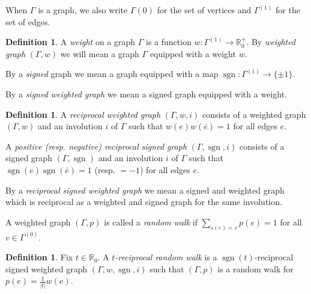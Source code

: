 \documentclass[12pt]{article}
\theoremstyle{change}
\DeclareMathOperator{\sgn}{\mathrm{sgn}}
\newcommand{\R}{\mathbb{R}}
\theoremstyle{definition}
\newtheorem{Def}[Theorem]{Definition}
\numberwithin{equation}{section}
\begin{document}
When $\Gamma$ is a graph, we also write $\Gamma{(0)}$ for the set of vertices and $\Gamma^{(1)}$ for the set of edges.


\begin{Def} A \emph{weight} on a graph $\Gamma$ is a function $w:\Gamma^{(1)}\rightarrow \R_0^+$. By \emph{weighted graph} $(\Gamma,w)$ we will mean a graph $\Gamma$ equipped with a weight $w$. 

By a \emph{signed} graph we mean a graph equipped with a map $\sgn:\Gamma^{(1)}\rightarrow \{\pm 1\}$. 

By a \emph{signed weighted graph} we mean a signed graph equipped with a weight.
\end{Def}


\begin{Def} A \emph{reciprocal weighted graph} $(\Gamma,w,i)$ consists of a weighted graph $(\Gamma,w)$ and an involution $i$ of $\Gamma$ such that $w(e)w(\bar{e}) = 1$ for all edges $e$. 

A \emph{positive (resp. negative) reciprocal signed graph} $(\Gamma,\sgn,i)$ consists of a signed graph $(\Gamma,\sgn)$ and an involution $i$ of $\Gamma$ such that $\sgn(e)\sgn(\bar{e}) = 1$ (resp. $=-1$) for all edges $e$. 

By a \emph{reciprocal signed weighted graph} we mean a signed and weighted graph which is reciprocal as a weighted and signed graph for the same involution. 

A weighted graph $(\Gamma,p)$ is called a \emph{random walk} if $\sum_{s(e)=v} p(e) = 1$ for all $v\in \Gamma^{(0)}$.
\end{Def}

\begin{Def} Fix $t\in \R_0$. A \emph{$t$-reciprocal random walk} is a $\sgn(t)$-reciprocal signed weighted graph $(\Gamma,w,\sgn,i)$ such that $(\Gamma,p)$ is a random walk for $p(e) = \frac{1}{|t|}w(e)$.  
\end{Def}


\end{document}
